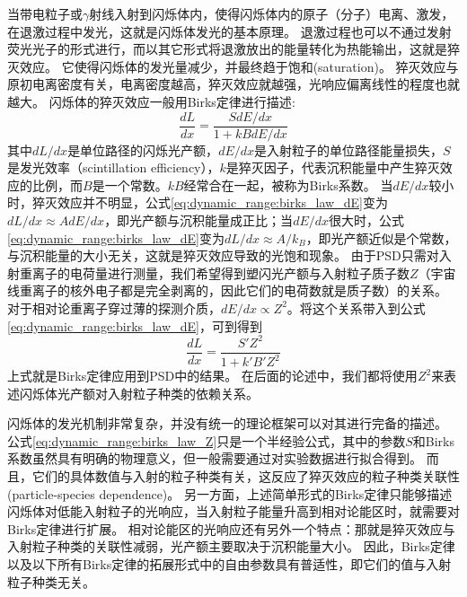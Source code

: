 当带电粒子或$\gamma$射线入射到闪烁体内，使得闪烁体内的原子（分子）电离、激发，在退激过程中发光，这就是闪烁体发光的基本原理。
退激过程也可以不通过发射荧光光子的形式进行，而以其它形式将退激放出的能量转化为热能输出，这就是猝灭效应。
它使得闪烁体的发光量减少，并最终趋于饱和(saturation)。
猝灭效应与原初电离密度有关，电离密度越高，猝灭效应就越强，光响应偏离线性的程度也就越大。
闪烁体的猝灭效应一般用Birks定律进行描述\cite{birks_article_1951}:
\begin{equation}
	\frac{dL}{dx} = \frac{SdE/dx}{1+kBdE/dx}
	\label{eq:dynamic_range:birks_law_dE}
\end{equation}
其中$dL/dx$是单位路径的闪烁光产额，$dE/dx$是入射粒子的单位路径能量损失，$S$是发光效率（scintillation efficiency），$k$是猝灭因子，代表沉积能量中产生猝灭效应的比例，而$B$是一个常数。$kB$经常合在一起，被称为Birks系数。
当$dE/dx$较小时，猝灭效应并不明显，公式\ref{eq:dynamic_range:birks_law_dE}变为$dL/dx \approx AdE/dx$，即光产额与沉积能量成正比；当$dE/dx$很大时，公式\ref{eq:dynamic_range:birks_law_dE}变为$dL/dx \approx A/k_B$，即光产额近似是个常数，与沉积能量的大小无关，这就是猝灭效应导致的光饱和现象。
由于PSD只需对入射重离子的电荷量进行测量，我们希望得到塑闪光产额与入射粒子质子数$Z$（宇宙线重离子的核外电子都是完全剥离的，因此它们的电荷数就是质子数）的关系。
对于相对论重离子穿过薄的探测介质，$dE/dx \propto Z^2$。将这个关系带入到公式\ref{eq:dynamic_range:birks_law_dE}，可到得到
\begin{equation}
	\frac{dL}{dx} = \frac{S' Z^2}{1+{k'}{B'} Z^2}
	\label{eq:dynamic_range:birks_law_Z}
\end{equation}
上式就是Birks定律应用到PSD中的结果。
在后面的论述中，我们都将使用$Z^2$来表述闪烁体光产额对入射粒子种类的依赖关系。

闪烁体的发光机制非常复杂，并没有统一的理论框架可以对其进行完备的描述。
公式\ref{eq:dynamic_range:birks_law_Z}只是一个半经验公式，其中的参数$S$和Birks系数虽然具有明确的物理意义，但一般需要通过对实验数据进行拟合得到。
而且，它们的具体数值与入射的粒子种类有关，这反应了猝灭效应的粒子种类关联性(particle-species dependence)。
另一方面，上述简单形式的Birks定律只能够描述闪烁体对低能入射粒子的光响应，当入射粒子能量升高到相对论能区时，就需要对Birks定律进行扩展。
相对论能区的光响应还有另外一个特点：那就是猝灭效应与入射粒子种类的关联性减弱，光产额主要取决于沉积能量大小\cite{matsufuji_response_1999}。
因此，Birks定律以及以下所有Birks定律的拓展形式中的自由参数具有普适性，即它们的值与入射粒子种类无关。

